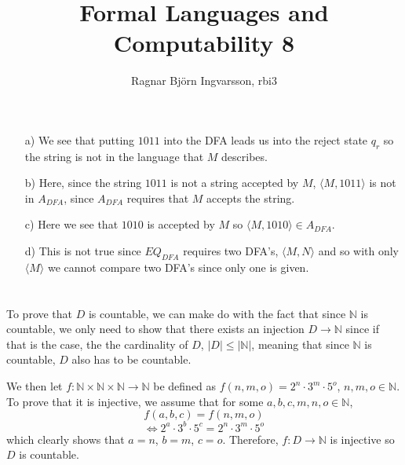 \documentclass{article}
\title{Formal Languages and Computability 8}
\author{Ragnar Björn Ingvarsson, rbi3}
\begin{document}
\renewcommand\thepage{}

	\maketitle

	\newpage
	\setcounter{page}{1}
	\renewcommand\thepage{\arabic{page}}

	\section{}
	\begin{itemize}
		\item[a)] We see that putting $1011$ into the DFA leads us into 
			the reject state $q_r$ so the string is not in the language 
			that $M$ describes.
		\item[b)] Here, since the string $1011$ is not a string accepted by 
			$M$, $\langle M,1011\rangle$ is not in $A_{DFA}$, since $A_{DFA}$ 
			requires that $M$ accepts the string.
		\item[c)] Here we see that $1010$ is accepted by $M$ so 
			$\langle M,1010\rangle \in A_{DFA}$.
		\item[d)] This is not true since $EQ_{DFA}$ requires two DFA's, 
			$\langle M,N\rangle$ and so with only $\langle M\rangle$ we 
			cannot compare two DFA's since only one is given.
	\end{itemize}

	\section{}
	To prove that $D$ is countable, we can make do with the fact that since 
	$\mathbb{N}$ is countable, we only need to show that there exists an 
	injection $D\rightarrow \mathbb{N}$ since if that is the case, the 
	the cardinality of $D$, $|D| \leq |\mathbb{N}|$, meaning that since 
	$\mathbb{N}$ is countable, $D$ also has to be countable.

	We then let $f: \mathbb{N}\times\mathbb{N}\times\mathbb{N}\rightarrow\mathbb{N}$ be defined 
	as $f(n,m,o) = 2^n\cdot3^m\cdot5^o$, $n,m,o\in\mathbb{N}$. To prove that it is injective, we 
	assume that for some $a,b,c,m,n,o\in\mathbb{N}$,
	\[
		f(a,b,c) = f(n,m,o)
	\]
	\[
		\iff 2^a\cdot3^b\cdot5^c = 2^n\cdot3^m\cdot5^o
	\]
    which clearly shows that $a=n$, $b=m$, $c=o$. Therefore, $f: D\rightarrow\mathbb{N}$ is injective so $D$ is countable.
\end{document}

